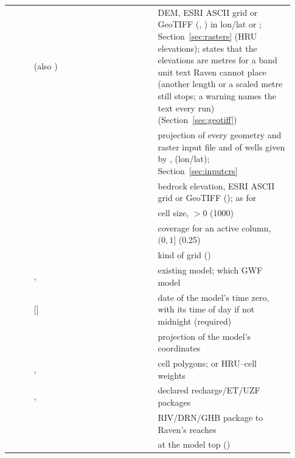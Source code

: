 \begin{longtable}{P{0.08\linewidth}P{0.4\linewidth}P{0.448\linewidth}}
 &  (also ) & DEM, ESRI ASCII grid or GeoTIFF (, ) in lon/lat or ; Section~\ref{sec:rasters} (HRU elevations);  states that the elevations are metres for a band unit text Raven cannot place (another length or a scaled metre still stops; a warning names the text every run) (Section~\ref{sec:geotiff})\label{cmd:LandSurface}\\
 &  & projection of every geometry and raster input file and of wells given by ,  (lon/lat); Section~\ref{sec:inputcrs}\label{cmd:InputCRS}\\
 &  & bedrock elevation, ESRI ASCII grid or GeoTIFF ();  as for \label{cmd:BedrockSurface}\\
 &  & cell size, $>0$ (1000)\label{cmd:GridCellSize}\\
 &  & coverage for an active column, $(0,1]$ (0.25)\label{cmd:MinCellCoverage}\\
 &  & kind of grid ()\label{cmd:GridType}\\
 & ,  & existing model; which GWF model\label{cmd:MF6Simulation}\\
 &  [] & date of the model's time zero, with its time of day if not midnight (required)\label{cmd:MF6StartDate}\\
 &  & projection of the model's coordinates\label{cmd:MF6CRS}\\
 & ,  & cell polygons; or HRU--cell weights\label{cmd:MF6GridFile}\\
 & ,  & declared recharge/ET/UZF packages\label{cmd:RavenTakesOver}\\
 &  & RIV/DRN/GHB package to Raven's reaches\label{cmd:StreamPackage}\\
 &  &  at the model top ()\label{cmd:SeepageToRaven}\\

\end{longtable}

